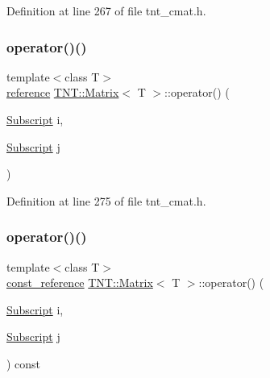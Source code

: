 Definition at line 267 of file tnt\+\_\+cmat.\+h.

\mbox{\label{classTNT_1_1Matrix_a47404159b33c55161f4eb8e974c1592c}} 
\subsubsection{\texorpdfstring{operator()()}{operator()()}\hspace{0.1cm}{\footnotesize\ttfamily [3/4]}}
{\footnotesize\ttfamily template$<$class T$>$ \\
\hyperlink{classTNT_1_1Matrix_a129951783800dd85d3dcc1f6dd2062f9}{reference} \hyperlink{classTNT_1_1Matrix}{T\+N\+T\+::\+Matrix}$<$ T $>$\+::operator() (\begin{DoxyParamCaption}\item[{\hyperlink{namespaceTNT_af22e3f1460e145c04ce4e7d701e4c1c1}{Subscript}}]{i,  }\item[{\hyperlink{namespaceTNT_af22e3f1460e145c04ce4e7d701e4c1c1}{Subscript}}]{j }\end{DoxyParamCaption})\hspace{0.3cm}{\ttfamily [inline]}}



Definition at line 275 of file tnt\+\_\+cmat.\+h.

\mbox{\label{classTNT_1_1Matrix_a75eacc4e5b6f44a03556a22e2155b743}} 
\subsubsection{\texorpdfstring{operator()()}{operator()()}\hspace{0.1cm}{\footnotesize\ttfamily [4/4]}}
{\footnotesize\ttfamily template$<$class T$>$ \\
\hyperlink{classTNT_1_1Matrix_a6d3ceefbf1675aad4acadac4f78ed04b}{const\+\_\+reference} \hyperlink{classTNT_1_1Matrix}{T\+N\+T\+::\+Matrix}$<$ T $>$\+::operator() (\begin{DoxyParamCaption}\item[{\hyperlink{namespaceTNT_af22e3f1460e145c04ce4e7d701e4c1c1}{Subscript}}]{i,  }\item[{\hyperlink{namespaceTNT_af22e3f1460e145c04ce4e7d701e4c1c1}{Subscript}}]{j }\end{DoxyParamCaption}) const\hspace{0.3cm}{\ttfamily [inline]}}



